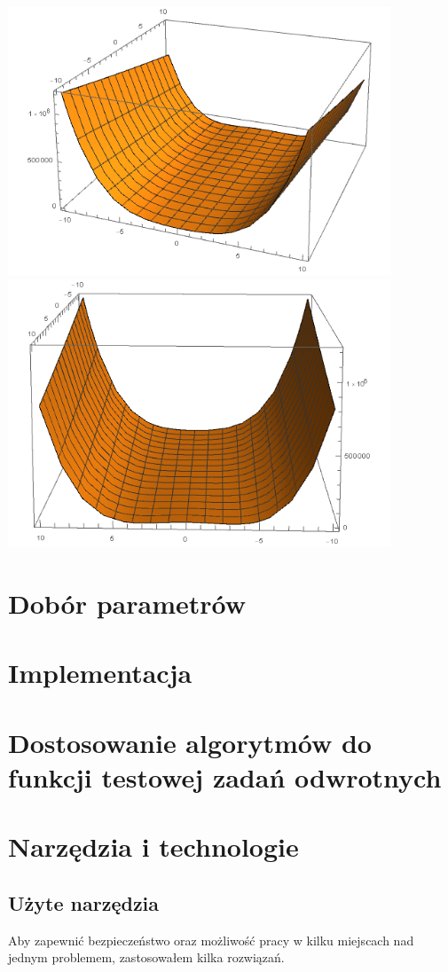 \documentclass[twoside]{projektInzynierskiMS1}
\newcommand{\si}{ś}
\begin{document}
\includegraphics[height=8cm]{rosenbrockFunction1.png}\\
\includegraphics[height=8cm]{rosenbrockFunction2.png}\\

\section{Dobór parametrów}
\section{Implementacja}
\section{Dostosowanie algorytmów do funkcji testowej zadań odwrotnych}
\section{Narzędzia i technologie}
	\subsection{Użyte narzędzia}
	Aby zapewnić bezpieczeństwo oraz możliwo\si ć pracy w kilku miejscach nad jednym problemem, zastosowałem kilka rozwiązań.
\end{document}
